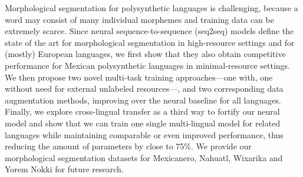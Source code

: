Morphological segmentation for polysynthetic languages is challenging, because a word may consist of many individual morphemes and training data can be extremely scarce. Since neural sequence-to-sequence (seq2seq) models define the state of the art for morphological segmentation in high-resource settings and for (mostly) European languages, we first show that they also obtain competitive performance for Mexican polysynthetic languages in minimal-resource settings. We then propose two novel multi-task training approaches—one with, one without need for external unlabeled resources—, and two corresponding data augmentation methods, improving over the neural baseline for all languages. Finally, we explore cross-lingual transfer as a third way to fortify our neural model and show that we can train one single multi-lingual model for related languages while maintaining comparable or even improved performance, thus reducing the amount of parameters by close to 75\%. We provide our morphological segmentation datasets for Mexicanero, Nahuatl, Wixarika and Yorem Nokki for future research.
